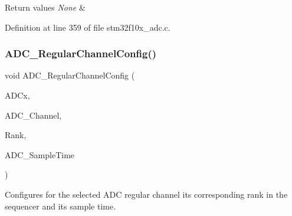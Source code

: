 \begin{DoxyRetVals}{Return values}
{\em None} & \\
\hline
\end{DoxyRetVals}


Definition at line 359 of file stm32f10x\+\_\+adc.\+c.

\mbox{\label{group___a_d_c___private___functions_gac531adb577b648d4bb8881f2ed627d52}} 
\subsubsection{\texorpdfstring{A\+D\+C\+\_\+\+Regular\+Channel\+Config()}{ADC\_RegularChannelConfig()}}
{\footnotesize\ttfamily void A\+D\+C\+\_\+\+Regular\+Channel\+Config (\begin{DoxyParamCaption}\item[{\hyperlink{struct_a_d_c___type_def}{A\+D\+C\+\_\+\+Type\+Def} $\ast$}]{A\+D\+Cx,  }\item[{uint8\+\_\+t}]{A\+D\+C\+\_\+\+Channel,  }\item[{uint8\+\_\+t}]{Rank,  }\item[{uint8\+\_\+t}]{A\+D\+C\+\_\+\+Sample\+Time }\end{DoxyParamCaption})}



Configures for the selected A\+DC regular channel its corresponding rank in the sequencer and its sample time. 


